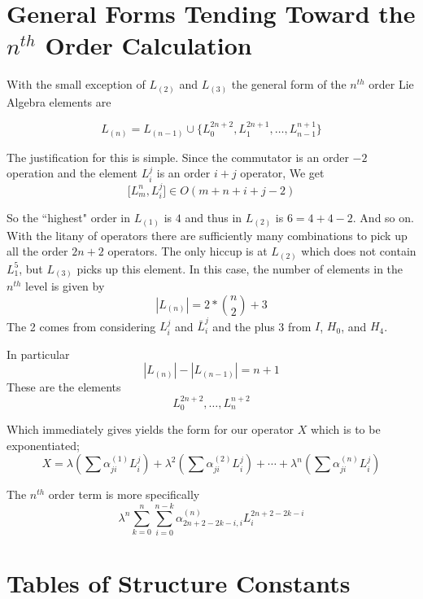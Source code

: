 \documentclass{article}
\newcommand{\lrbrack}[2]{\lbrack #1 , #2 \rbrack}
\begin{document}
\section*{General Forms Tending Toward the $n^{th}$ Order Calculation}

With the small exception of $L_{(2)}$ and $L_{(3)}$
the general form of the $n^{th}$ order Lie Algebra elements are

\begin{equation}
L_{(n)} = L_{(n-1)}\cup \{L_0^{2n+2},L_1^{2n+1},\dots,L_{n-1}^{n+1}\}
\end{equation}

The justification for this is simple.  Since the commutator is an order $-2$ operation and the element $L_i^j$ is an order $i+j$ operator, We get
\[
\lrbrack{L_m^n}{L_i^j} \in O(m+n+i+j-2)
\]

So the ``highest" order in $L_{(1)}$ is $4$ and thus in $L_{(2)}$ is $6 = 4+4-2$.  And so on.  With the litany of operators there are sufficiently many combinations to pick up all the order $2n+2$ operators.  The only hiccup is at $L_{(2)}$ which does not contain $L_1^5$, but $L_{(3)}$ picks up this element.  
In this case, the number of elements in the $n^{th}$ level is given by
\[
|L_{(n)}| = 2*{n \choose 2} + 3
\]
The 2 comes from considering $L_i^j$ and $\bar{L}_i^j$ and the plus 3 from $I$, $H_0$, and $H_4$.

In particular
\[
|L_{(n)}| - |L_{(n-1)}| = n+1
\]
These are the elements
\[
L_0^{2n+2},\dots, L_{n}^{n+2}
\]

Which immediately gives yields the form for our operator $X$ which is to be exponentiated;
\begin{equation}
X = \lambda (\sum \alpha^{(1)}_{ji}L_i^j) + \lambda^2 (\sum \alpha^{(2)}_{ji}L_i^j) + \cdots + \lambda^n (\sum \alpha^{(n)}_{ji}L_i^j)  
\end{equation}


The $n^{th}$ order term is more specifically 
\[
\lambda^n \sum_{k=0}^{n} \sum_{i=0}^{n-k}\alpha^{(n)}_{2n+2-2k-i,i}L_{i}^{2n+2-2k-i}
\]


\section*{Tables of Structure Constants}
	
\end{document}
